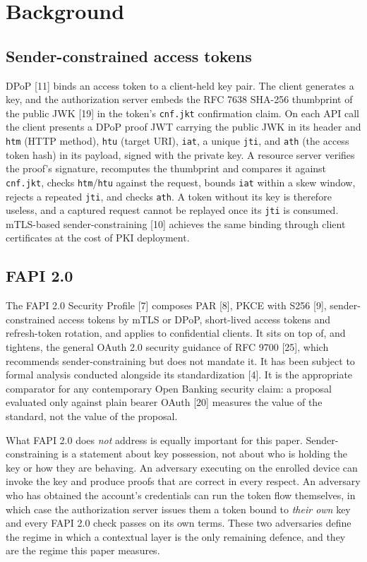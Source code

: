 \section{Background}
\label{sec:background}

\subsection{Sender-constrained access tokens}

DPoP [11] binds an access token to a client-held key pair. The client generates a key, and the authorization server embeds the RFC 7638 SHA-256 thumbprint of the public JWK [19] in the token's \texttt{cnf.jkt} confirmation claim. On each API call the client presents a DPoP proof JWT carrying the public JWK in its header and \texttt{htm} (HTTP method), \texttt{htu} (target URI), \texttt{iat}, a unique \texttt{jti}, and \texttt{ath} (the access token hash) in its payload, signed with the private key. A resource server verifies the proof's signature, recomputes the thumbprint and compares it against \texttt{cnf.jkt}, checks \texttt{htm}/\texttt{htu} against the request, bounds \texttt{iat} within a skew window, rejects a repeated \texttt{jti}, and checks \texttt{ath}. A token without its key is therefore useless, and a captured request cannot be replayed once its \texttt{jti} is consumed. mTLS-based sender-constraining [10] achieves the same binding through client certificates at the cost of PKI deployment.

\subsection{FAPI 2.0}

The FAPI 2.0 Security Profile [7] composes PAR [8], PKCE with S256 [9], sender-constrained access tokens by mTLS or DPoP, short-lived access tokens and refresh-token rotation, and applies to confidential clients. It sits on top of, and tightens, the general OAuth 2.0 security guidance of RFC 9700 [25], which recommends sender-constraining but does not mandate it. It has been subject to formal analysis conducted alongside its standardization [4]. It is the appropriate comparator for any contemporary Open Banking security claim: a proposal evaluated only against plain bearer OAuth [20] measures the value of the standard, not the value of the proposal.

What FAPI 2.0 does \textit{not} address is equally important for this paper. Sender-constraining is a statement about key possession, not about who is holding the key or how they are behaving. An adversary executing on the enrolled device can invoke the key and produce proofs that are correct in every respect. An adversary who has obtained the account's credentials can run the token flow themselves, in which case the authorization server issues them a token bound to \textit{their own} key and every FAPI 2.0 check passes on its own terms. These two adversaries define the regime in which a contextual layer is the only remaining defence, and they are the regime this paper measures.

